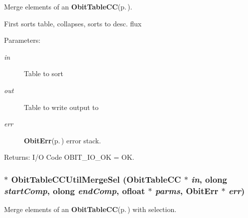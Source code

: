 Merge elements of an {\bf Obit\-Table\-CC}{\rm (p.\,\pageref{structObitTableCC})}. 

First sorts table, collapses, sorts to desc. flux \begin{Desc}
\item[Parameters:]
\begin{description}
\item[{\em in}]Table to sort \item[{\em out}]Table to write output to \item[{\em err}]{\bf Obit\-Err}{\rm (p.\,\pageref{structObitErr})} error stack. \end{description}
\end{Desc}
\begin{Desc}
\item[Returns:]I/O Code OBIT\_\-IO\_\-OK = OK. \end{Desc}
\subsubsection{$\ast$ Obit\-Table\-CCUtil\-Merge\-Sel ({\bf Obit\-Table\-CC} $\ast$ {\em in}, {\bf olong} {\em start\-Comp}, {\bf olong} {\em end\-Comp}, {\bf ofloat} $\ast$ {\em parms}, {\bf Obit\-Err} $\ast$ {\em err})}\label{ObitTableCCUtil_8c_a9}


Merge elements of an {\bf Obit\-Table\-CC}{\rm (p.\,\pageref{structObitTableCC})} with selection. 

